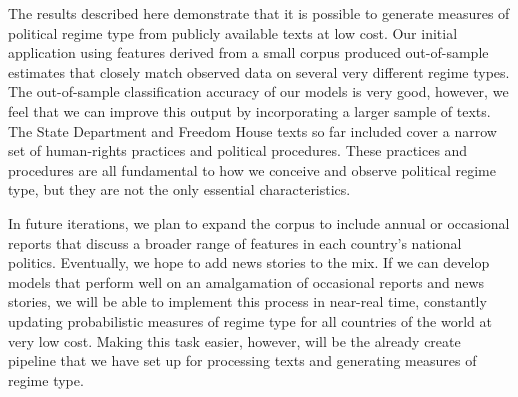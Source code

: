 \documentclass[pdftex,12pt,fullpage,oneside]{amsart}
\begin{document}
The results described here demonstrate that it is possible to generate measures of political regime type from publicly available texts at low cost. Our initial application using features derived from a small corpus produced out-of-sample estimates that closely match observed data on several very different regime types. The out-of-sample classification accuracy of our models is very good, however, we feel that we can improve this output by incorporating a larger sample of texts. The State Department and Freedom House texts so far included cover a narrow set of human-rights practices and political procedures. These practices and procedures are all fundamental to how we conceive and observe political regime type, but they are not the only essential characteristics.

In future iterations, we plan to expand the corpus to include annual or occasional reports that discuss a broader range of features in each country's national politics. Eventually, we hope to add news stories to the mix. If we can develop models that perform well on an amalgamation of occasional reports and news stories, we will be able to implement this process in near-real time, constantly updating probabilistic measures of regime type for all countries of the world at very low cost. Making this task easier, however, will be the already create pipeline that we have set up for processing texts and generating measures of regime type. 

\newpage


\end{document}
